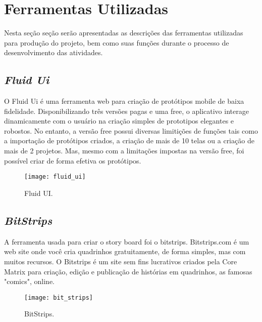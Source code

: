 \chapter[Ferramentas Utilizadas]{Ferramentas Utilizadas}
\label{chap:ferramentas}
	
	Nesta seção seção serão apresentadas as descrições das ferramentas utilizadas para produção do projeto, bem como suas funções durante o processo de desenvolvimento das atividades.

	\section[Fluid Ui]{\emph{Fluid Ui}}
	\label{sec:ferramentas_fluidUI}

		O Fluid Ui é uma ferramenta web para criação de protótipos mobile de baixa fidelidade. Disponibilizando três versões pagas e uma free, o aplicativo interage dinamicamente com o usuário na criação simples de prototipos elegantes e robostos. No entanto, a versão free possui diversas limitições de funções tais como a importação de protótipos criados, a criação de mais de 10 telas ou a criação de mais de 2 projetos. Mas, mesmo com a limitações impostas na versão free, foi possível criar de forma efetiva os protótipos.

		\begin{figure}[h]
			\centering
			\texttt{[image: fluid\_ui]}
			\caption[Fluid UI]{Fluid UI.}
			\label{fig:fluid_ui}
		\end{figure}

	\section[BitStrips]{\emph{BitStrips}}
	\label{sec:ferramentas_bitStrips}

		A ferramenta usada para criar o story board foi o bitstrips. Bitstrips.com é um web site onde você cria quadrinhos gratuitamente, de forma simples, mas com muitos recursos. O Bitstrips é um site sem fins lucrativos criados pela Core Matrix para criação, edição e publicação de histórias em quadrinhos, as famosas "comics", online.
		
		\newpage

		\begin{figure}[h]
			\centering
			\texttt{[image: bit\_strips]}
			\caption[BitStrips]{BitStrips.}
			\label{fig:bit_strips}
		\end{figure}